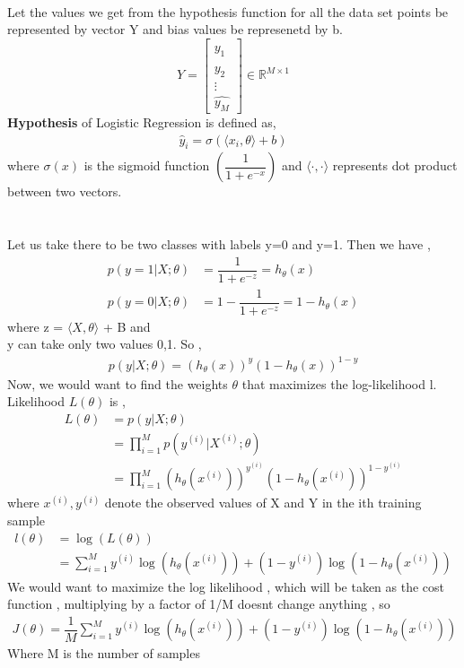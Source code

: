 \documentclass[12pt,a4paper]{article}
\begin{document}
{\begin{align*}
\end{align*}
Let the values we get from the hypothesis function for all the data set points be represented by vector Y and bias values be represenetd by b.
\begin{equation*}
  Y = \begin{bmatrix} 
\hat{y_1}\\\hat{y_2}\\\vdots\\\hat{y_M} 
\end{bmatrix}\in \mathbb{R}^{M \times 1}
\end{equation*}
\textbf{Hypothesis} of Logistic Regression is defined as,\\
\begin{align*}
    \hat{y}_i = \sigma(\langle x_i, \theta\rangle  + b)
\end{align*}
where $\sigma(x)$ is the sigmoid function  $\left(\dfrac{1}{1+ e^{-x}}\right)$ and $\langle \cdot,\cdot\rangle$ represents dot product between two vectors. \\



\section{}
Let us take there to be two classes with labels y=0 and y=1. Then we have , 
\begin{align*}
    p(y=1|X;\theta) &= \dfrac{1}{1+e^{-z}} = h_\theta(x) \\
    p(y=0|X;\theta) &= 1 - \dfrac{1}{1+e^{-z}} = 1-h_\theta(x)
\end{align*}
where z = $\langle X,\theta \rangle$ + B and \\ y can take only two values {0,1}.
So , 
\begin{align*}
    p(y|X;\theta) = (h_\theta(x))^{y}(1-h_\theta(x))^{1-y}
\end{align*}
Now, we would want to find the weights $\theta$ that maximizes the log-likelihood l.
Likelihood $L(\theta)$ is ,
\begin{align*}
    L(\theta) &= p(y|X;\theta) \\ &= \prod_{i=1}^{M} p(y^{(i)}|X^{(i)};\theta) \\
    &= \prod_{i=1}^{M} (h_\theta(x^{(i)}))^{y^{(i)}}(1-h_\theta(x^{(i)}))^{1-y^{(i)}}
\end{align*}
where $x^{(i)} , y^{(i)}$ denote the observed values of X and Y in the ith training sample
\begin{align*}
    l(\theta) &= \log(L(\theta)) \\
    &= \sum^{M}_{i = 1} y^{(i)}\log(h_\theta(x^{(i)})) + (1 - y^{(i)})\log(1-h_\theta(x^{(i)}))
\end{align*}
We would want to maximize the log likelihood , which will be taken as the cost function , multiplying by a factor of 1/M doesnt change anything , so
\begin{align*}
    J(\theta) = \dfrac{1}{M} \sum^{M}_{i = 1} y^{(i)}\log(h_\theta(x^{(i)})) + (1 - y^{(i)})\log(1-h_\theta(x^{(i)}))
\end{align*}
Where M is the number of samples


}
\end{document}
